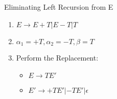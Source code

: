 \documentclass[handout]{beamer}
\begin{document}
\begin{frame}{Eliminating Left Recursion from E}
    \begin{enumerate}[<+->]
        \item $E \rightarrow E+T | E-T | T$
        \item $\alpha_1 = +T, \alpha_2=-T, \beta=T$
        \item Perform the Replacement:
        \begin{itemize}
            \item $E \rightarrow TE'$
            \item $E' \rightarrow +TE' | -TE' | \epsilon$
        \end{itemize}
    \end{enumerate}
\end{frame}
\end{document}

